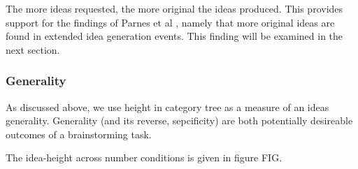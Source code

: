The more ideas requested, the more original the ideas produced. This provides support for the findings of Parnes et al \cite{parnes_effects_1961}, namely that more original ideas are found in extended idea generation events. This finding will be examined in the next section.

\subsubsection{Generality}

As discussed above, we use height in category tree as a measure of an ideas generality. Generality (and its reverse, sepcificity) are both potentially desireable outcomes of a brainstorming task.

The idea-height across number conditions is given in figure FIG.

